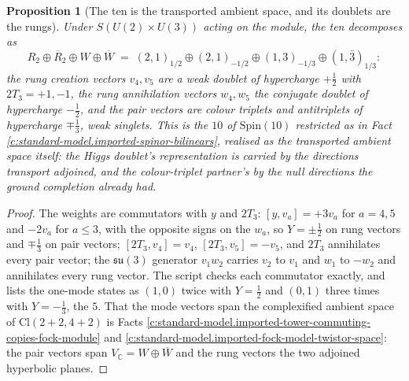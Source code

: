 \documentclass[11pt]{article}
\newtheorem{proposition}[theorem]{Proposition}
\theoremstyle{definition}
\theoremstyle{plain}
\providecommand{\C}{}\renewcommand{\C}{\mathbb{C}}
\providecommand{\Cl}{}\renewcommand{\Cl}{\mathrm{Cl}}
\providecommand{\su}{}\renewcommand{\su}{\mathfrak{su}}
\begin{document}
\begin{proposition}[The ten is the transported ambient space, and its doublets are the rungs]\label{c:standard-model.ten-transported-ambient-space-doublets-are}
Under $S(U(2) \times U(3))$ acting on the module, the ten decomposes as
\[
R_{2} \oplus \overline{R}_{2} \oplus W \oplus \overline{W} \;=\; (2,1)_{1/2} \oplus (2,1)_{-1/2} \oplus (1,3)_{-1/3} \oplus (1,\bar{3})_{1/3}:
\]
the rung creation vectors $v_{4}, v_{5}$ are a weak doublet of hypercharge $+\tfrac12$ with $2T_{3} = +1, -1$, the rung annihilation vectors $w_{4}, w_{5}$ the conjugate doublet of hypercharge $-\tfrac12$, and the pair vectors are colour triplets and antitriplets of hypercharge $\mp\tfrac13$, weak singlets. This is the $10$ of $\mathrm{Spin}(10)$ restricted as in Fact \ref{c:standard-model.imported-spinor-bilinears}, realised as the transported ambient space itself: the Higgs doublet's representation is carried by the directions transport adjoined, and the colour-triplet partner's by the null directions the ground completion already had.
\end{proposition}
\begin{proof}
The weights are commutators with $y$ and $2T_{3}$: $[y, v_{a}] = +3v_{a}$ for $a = 4, 5$ and $-2v_{a}$ for $a \le 3$, with the opposite signs on the $w_{a}$, so $Y = \pm\tfrac12$ on rung vectors and $\mp\tfrac13$ on pair vectors; $[2T_{3}, v_{4}] = v_{4}$, $[2T_{3}, v_{5}] = -v_{5}$, and $2T_{3}$ annihilates every pair vector; the $\su(3)$ generator $v_{1}w_{2}$ carries $v_{2}$ to $v_{1}$ and $w_{1}$ to $-w_{2}$ and annihilates every rung vector. The script checks each commutator exactly, and lists the one-mode states as $(1,0)$ twice with $Y = \tfrac12$ and $(0,1)$ three times with $Y = -\tfrac13$, the $5$. That the mode vectors span the complexified ambient space of $\Cl(2{+}2, 4{+}2)$ is Facts \ref{c:standard-model.imported-tower-commuting-copies-fock-module} and \ref{c:standard-model.imported-fock-model-twistor-space}: the pair vectors span $V_{\C} = W \oplus \overline{W}$ and the rung vectors the two adjoined hyperbolic planes.

\end{proof}
\end{document}
